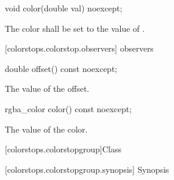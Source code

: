 \begin{itemdecl}
	void color(double val) noexcept;
\end{itemdecl}
\begin{itemdescr}
	\pnum
	\effects
	The color shall be set to the value of .
\end{itemdescr}

 [colorstops.colorstop.observers]{ observers}

\begin{itemdecl}
	double offset() const noexcept;
\end{itemdecl}
\begin{itemdescr}
	\pnum
	\returns
	The value of the offset.
\end{itemdescr}

\begin{itemdecl}
	rgba_color color() const noexcept;
\end{itemdecl}
\begin{itemdescr}
	\pnum
	\returns
	The value of the color.
\end{itemdescr}

 [colorstops.colorstopgroup]{Class }

 [colorstops.colorstopgroup.synopsis] { Synopsis}

